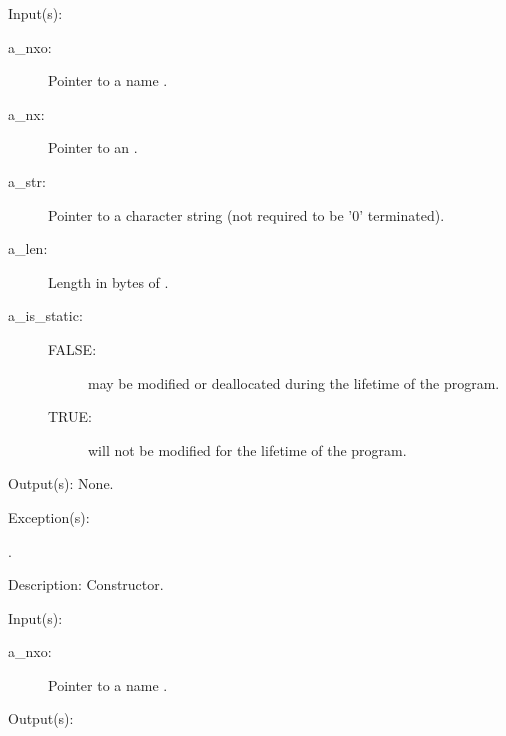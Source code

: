 \begin{capi}
\label{nxo_name_new}
	\begin{capilist}
	\item[Input(s): ]
		\begin{description}\item[]
		\item[a\_nxo: ]
			Pointer to a name .
		\item[a\_nx: ]
			Pointer to an .
		\item[a\_str: ]
			Pointer to a character string (not required to be
			'{\bs}0' terminated).
		\item[a\_len: ]
			Length in bytes of .
		\item[a\_is\_static: ]
			\begin{description}\item[]
			\item[FALSE: ]
				 may be modified or deallocated
				during the lifetime of the program.
			\item[TRUE: ]
				 will not be modified for the
				lifetime of the program.
			\end{description}
		\end{description}
	\item[Output(s): ] None.
	\item[Exception(s): ]
		\begin{description}\item[]
		\item[.]
		\end{description}
	\item[Description: ]
		Constructor.
	\end{capilist}
\label{nxo_name_str_get}
	\begin{capilist}
	\item[Input(s): ]
		\begin{description}\item[]
		\item[a\_nxo: ]
			Pointer to a name \classname{nxo}.
		\end{description}
	\item[Output(s): ]
		\begin{description}\item[]

\end{description}
\end{capilist}
\end{capi}
